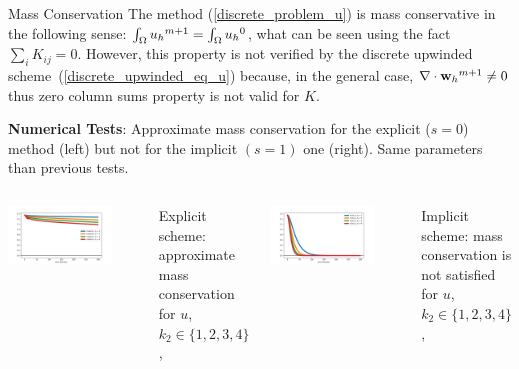 \documentclass[final]{beamer}
\newlength{\onecolwid}
\begin{document}
\begin{frame}[t]
\begin{columns}[t]
\begin{column}{\onecolwid}
      \vspace{0.2cm}

      \begin{block}{Mass Conservation}
          The method (\ref{discrete_problem_u}) is mass conservative in the following sense:
            $\int_\Omega {{u_{h}}^{m+1}} = \int_\Omega {u_{h}}^0$,
          what can be seen using the fact $\sum_i K_{ij}=0$. However,
          this property is \alert{not verified} by the discrete
          upwinded scheme~(\ref{discrete_upwinded_eq_u}) because, in
          the general case, $\nabla\cdot{}{{\mathbf{w}_{h}}^{m+1}}\neq 0$ thus zero column sums
          property is not valid for $K$.

          \bigskip\par
          \textbf{Numerical Tests}: Approximate mass
          conservation for the explicit ($s=0$) method (left) but not
          for the implicit $(s=1)$ one (right). Same parameters than
          previous tests.
        \begin{columns}
          \includegraphics[width=0.8\textwidth]{positive_EXPLICIT_scheme_mass_k1=1,2,3,4.png}
          \par
          \small \alert{Explicit} scheme: {approximate mass
            conservation} for $u$, $k_2\in\{1,2,3,4\}$,

          \includegraphics[width=0.8\textwidth]{positive_scheme_mass_k1=1,2,3,4.png}
          \par
          \small \alert{Implicit} scheme: mass conservation is
          \alert{{not satisfied}} for $u$, $k_2\in\{1,2,3,4\}$,
        \end{columns}
      \end{block}


\end{column}
\end{columns}
\end{frame}
\end{document}

